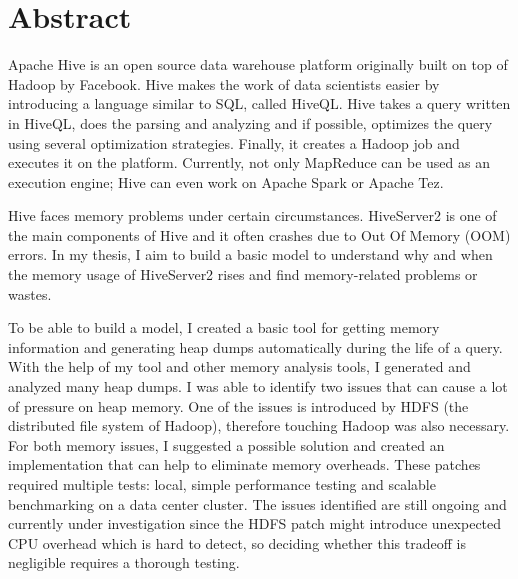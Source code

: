 \vfill
\selectenglish


\chapter*{Abstract}
Apache Hive is an open source data warehouse platform originally built on top of Hadoop by Facebook. Hive makes the work of data scientists easier by introducing a language similar to SQL, called HiveQL. Hive takes a query written in HiveQL, does the parsing and analyzing and if possible, optimizes the query using several optimization strategies. Finally, it creates a Hadoop job and executes it on the platform. Currently, not only MapReduce can be used as an execution engine; Hive can even work on Apache Spark or Apache Tez. 

Hive faces memory problems under certain circumstances. HiveServer2 is one of the main components of Hive and it often crashes due to Out Of Memory (OOM) errors. In my thesis, I aim to build a basic model to understand why and when the memory usage of HiveServer2 rises and find memory-related problems or wastes.

To be able to build a model, I created a basic tool for getting memory information and generating heap dumps automatically during the life of a query. With the help of my tool and other memory analysis tools, I generated and analyzed many heap dumps. I was able to identify two issues that can cause a lot of pressure on heap memory. One of the issues is introduced by HDFS (the distributed file system of Hadoop), therefore touching Hadoop was also necessary. For both memory issues, I suggested a possible solution and created an implementation that can help to eliminate memory overheads. These patches required multiple tests: local, simple performance testing and scalable benchmarking on a data center cluster. The issues identified are still ongoing and currently under investigation since the HDFS patch might introduce unexpected CPU overhead which is hard to detect, so deciding whether this tradeoff is negligible requires a thorough testing. 

\vfill
\selectthesislanguage

\setcounter{romanPage}{\value{page}}
